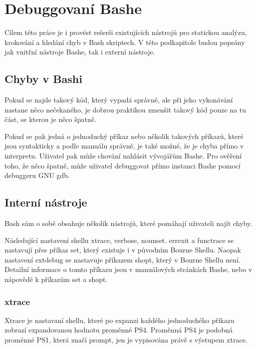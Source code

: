 \documentclass[thesis=M,czech]{FITthesis}[2012/06/26]
\begin{document}



%
%
\section{Debuggovaní Bashe} %

Cílem této práce je i provést rešerši existujících nástrojů pro statickou analýzu, krokování a hledání chyb v Bash skriptech. V této podkapitole budou popsány jak vnitřní nástroje Bashe, tak i externí nástroje.


%
\subsection{Chyby v Bashi}

Pokud se najde takový kód, který vypadá správně, ale při jeho vykonávání nastane něco nečekaného, je dobrou praktikou zmenšit takový  kód pouze na tu část, se kterou je něco špatně.

Pokud se pak jedná o jednoduchý příkaz nebo několik takových příkazů, které jsou syntakticky a podle manuálu správně, je také možné, že je chyba přímo v interpretu. Uživatel pak může chování nahlásit vývojářům Bashe. Pro ověření toho, že něco špatně, může uživatel debuggovat přímo instanci Bashe pomocí debuggeru GNU gdb.



%
\subsection{Interní nástroje}

Bash sám o sobě obsahuje několik nástrojů, které pomáhají uživateli najít chyby. 

Následující nastavení shellu xtrace, verbose, nounset. errexit a functrace se nastavují přes příkaz set, který existuje i v původním Bourne Shellu. Naopak nastavení extdebug se nastavuje příkazem shopt, který v Bourne Shellu není. Detailní informace o tomto příkazu jsou v manuálových stránkách Bashe, nebo v nápovědě k příkazům set a shopt.

\subsubsection{xtrace}

Xtrace je nastavaní shellu, které po expanzi každého jednoduchého příkazu zobrazí expandovanou hodnotu proměnné PS4. Proměnná PS4 je podobná proměnné PS1, která značí prompt, jen je vypisována právě s výstupem xtrace.
\end{document}
